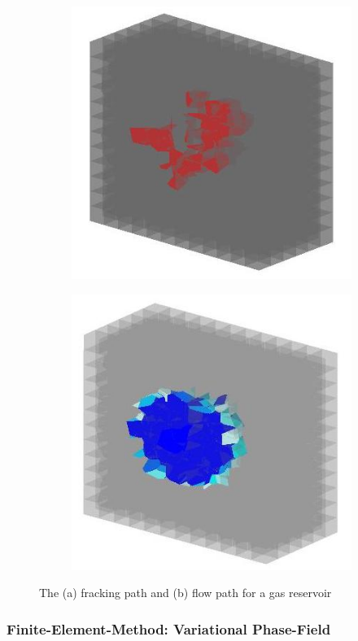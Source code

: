 \begin{figure}[!ht]
\begin{subfigure}[c]{0.48\textwidth}
\includegraphics[width=1\textwidth]{figures/Amir_ME4_Gas_Frack.png}
\subcaption{}
\label{fig:Amir_ME4_Gas_Frack}
\end{subfigure}
\hfill
\begin{subfigure}[c]{0.48\textwidth}
\includegraphics[width=1\textwidth]{figures/Amir_ME4_Gas_Flow.png}
\subcaption{}
\label{fig:Amir_ME4_Gas_Flow}
\end{subfigure}
\caption{The (a) fracking path and (b) flow path for a gas reservoir}
\end{figure}

\subsubsection*{Finite-Element-Method: Variational Phase-Field}

